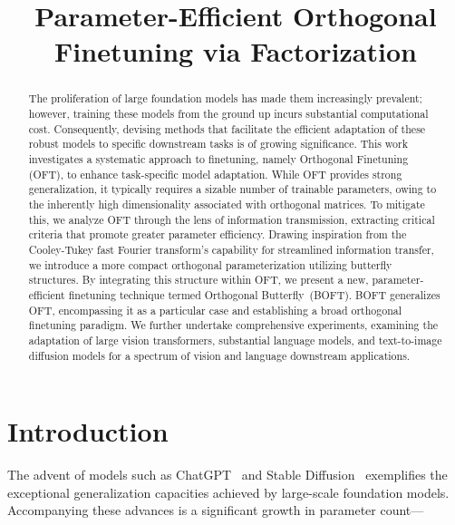 \title{Parameter-Efficient Orthogonal Finetuning via Factorization}

\begin{abstract}
The proliferation of large foundation models has made them increasingly prevalent; however, training these models from the ground up incurs substantial computational cost. Consequently, devising methods that facilitate the efficient adaptation of these robust models to specific downstream tasks is of growing significance. This work investigates a systematic approach to finetuning, namely Orthogonal Finetuning (OFT), to enhance task-specific model adaptation. While OFT provides strong generalization, it typically requires a sizable number of trainable parameters, owing to the inherently high dimensionality associated with orthogonal matrices. To mitigate this, we analyze OFT through the lens of information transmission, extracting critical criteria that promote greater parameter efficiency. Drawing inspiration from the Cooley-Tukey fast Fourier transform’s capability for streamlined information transfer, we introduce a more compact orthogonal parameterization utilizing butterfly structures. By integrating this structure within OFT, we present a new, parameter-efficient finetuning technique termed Orthogonal Butterfly~(BOFT). BOFT generalizes OFT, encompassing it as a particular case and establishing a broad orthogonal finetuning paradigm. We further undertake comprehensive experiments, examining the adaptation of large vision transformers, substantial language models, and text-to-image diffusion models for a spectrum of vision and language downstream applications.
\end{abstract}

\section{Introduction}

The advent of models such as ChatGPT~\cite{brown2020language,chen2021evaluating} and Stable Diffusion~\cite{rombach2022high} exemplifies the exceptional generalization capacities achieved by large-scale foundation models. Accompanying these advances is a significant growth in parameter count—

